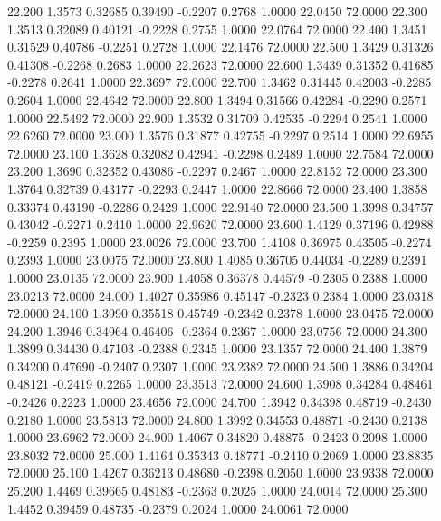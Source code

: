   22.200   1.3573   0.32685   0.39490  -0.2207   0.2768   1.0000  22.0450  72.0000
  22.300   1.3513   0.32089   0.40121  -0.2228   0.2755   1.0000  22.0764  72.0000
  22.400   1.3451   0.31529   0.40786  -0.2251   0.2728   1.0000  22.1476  72.0000
  22.500   1.3429   0.31326   0.41308  -0.2268   0.2683   1.0000  22.2623  72.0000
  22.600   1.3439   0.31352   0.41685  -0.2278   0.2641   1.0000  22.3697  72.0000
  22.700   1.3462   0.31445   0.42003  -0.2285   0.2604   1.0000  22.4642  72.0000
  22.800   1.3494   0.31566   0.42284  -0.2290   0.2571   1.0000  22.5492  72.0000
  22.900   1.3532   0.31709   0.42535  -0.2294   0.2541   1.0000  22.6260  72.0000
  23.000   1.3576   0.31877   0.42755  -0.2297   0.2514   1.0000  22.6955  72.0000
  23.100   1.3628   0.32082   0.42941  -0.2298   0.2489   1.0000  22.7584  72.0000
  23.200   1.3690   0.32352   0.43086  -0.2297   0.2467   1.0000  22.8152  72.0000
  23.300   1.3764   0.32739   0.43177  -0.2293   0.2447   1.0000  22.8666  72.0000
  23.400   1.3858   0.33374   0.43190  -0.2286   0.2429   1.0000  22.9140  72.0000
  23.500   1.3998   0.34757   0.43042  -0.2271   0.2410   1.0000  22.9620  72.0000
  23.600   1.4129   0.37196   0.42988  -0.2259   0.2395   1.0000  23.0026  72.0000
  23.700   1.4108   0.36975   0.43505  -0.2274   0.2393   1.0000  23.0075  72.0000
  23.800   1.4085   0.36705   0.44034  -0.2289   0.2391   1.0000  23.0135  72.0000
  23.900   1.4058   0.36378   0.44579  -0.2305   0.2388   1.0000  23.0213  72.0000
  24.000   1.4027   0.35986   0.45147  -0.2323   0.2384   1.0000  23.0318  72.0000
  24.100   1.3990   0.35518   0.45749  -0.2342   0.2378   1.0000  23.0475  72.0000
  24.200   1.3946   0.34964   0.46406  -0.2364   0.2367   1.0000  23.0756  72.0000
  24.300   1.3899   0.34430   0.47103  -0.2388   0.2345   1.0000  23.1357  72.0000
  24.400   1.3879   0.34200   0.47690  -0.2407   0.2307   1.0000  23.2382  72.0000
  24.500   1.3886   0.34204   0.48121  -0.2419   0.2265   1.0000  23.3513  72.0000
  24.600   1.3908   0.34284   0.48461  -0.2426   0.2223   1.0000  23.4656  72.0000
  24.700   1.3942   0.34398   0.48719  -0.2430   0.2180   1.0000  23.5813  72.0000
  24.800   1.3992   0.34553   0.48871  -0.2430   0.2138   1.0000  23.6962  72.0000
  24.900   1.4067   0.34820   0.48875  -0.2423   0.2098   1.0000  23.8032  72.0000
  25.000   1.4164   0.35343   0.48771  -0.2410   0.2069   1.0000  23.8835  72.0000
  25.100   1.4267   0.36213   0.48680  -0.2398   0.2050   1.0000  23.9338  72.0000
  25.200   1.4469   0.39665   0.48183  -0.2363   0.2025   1.0000  24.0014  72.0000
  25.300   1.4452   0.39459   0.48735  -0.2379   0.2024   1.0000  24.0061  72.0000
